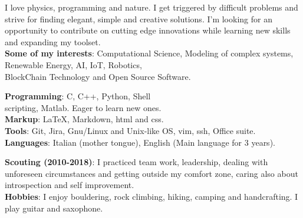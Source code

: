 \documentclass{coolcv}
\begin{document}
\thispagestyle{empty}

\begin{cvsidebar}



	\begin{cvcontactbox}
	\end{cvcontactbox}


	I love physics, programming and nature.
	I get triggered by difficult problems and strive for finding elegant, simple and creative solutions.
	I'm looking for an opportunity to contribute on cutting edge innovations while learning new skills and expanding my toolset.\\
	\textbf{Some of my interests}: Computational Science, Modeling of complex systems, Renewable Energy, AI, IoT, Robotics,\\
	BlockChain Technology and Open Source Software.\\


	\textbf{Programming}: C, C++, Python, Shell\\scripting, Matlab. Eager to learn new ones.\\
	\textbf{Markup}: \LaTeX, Markdown, html and css.\\
	\textbf{Tools}: Git, Jira, Gnu/Linux and Unix-like OS, vim, ssh, Office suite.\\
	\textbf{Languages}: Italian (mother tongue), English (Main language for 3 years).\\


	\textbf{Scouting (2010-2018)}: I practiced team work, leadership, dealing with unforeseen circumstances and getting outside my comfort zone, caring also about introspection and self improvement.\\
	\textbf{Hobbies}: I enjoy bouldering, rock climbing, hiking, camping and handcrafting. I play guitar and saxophone.\\

\end{cvsidebar}
\end{document}
